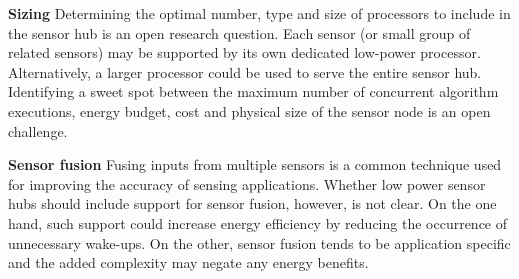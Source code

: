 {\bf Sizing} Determining the optimal number, type and size of
processors to include in the sensor hub is an open research question.
Each sensor (or small group of related sensors) may be supported by
its own dedicated low-power processor.  Alternatively, a larger
processor could be used to serve the entire sensor hub.  Identifying a
sweet spot between the maximum number of concurrent algorithm
executions, energy budget, cost and physical size of the sensor node
is an open challenge.

{\bf Sensor fusion} Fusing inputs from multiple sensors is a common
technique used for improving the accuracy of sensing applications.
Whether low power sensor hubs should include support for sensor
fusion, however, is not clear.  On the one hand, such support could
increase energy efficiency by reducing the occurrence of unnecessary
wake-ups.  On the other, sensor fusion tends to be application specific
and the added complexity may negate any energy benefits.

